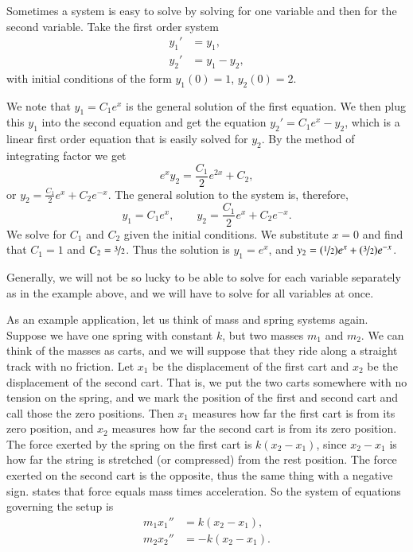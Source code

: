 \documentclass[12pt]{book}
\begin{document}
\begin{example}
Sometimes a system is easy to solve
by solving for one variable and then for the second variable.
Take 
the first order system
\begin{align*}
y_1' & = y_1 , \\
y_2' & = y_1 - y_2 ,
\end{align*}
with initial conditions
of the form $y_1(0) = 1$, $y_2(0) = 2$.

We note that $y_1 = C_1 e^x$ is the general solution of the first equation.
We then plug this $y_1$ into the second equation
and get the equation $y_2' = C_1e^x - y_2$, which is a linear first order
equation that is easily solved for $y_2$.  By the method of integrating
factor we get
\begin{equation*}
e^x y_2 = \frac{C_1}{2}e^{2x} + C_2 ,
\end{equation*}
or $y_2 = \frac{C_1}{2}e^{x} + C_2e^{-x}$.  The general solution to the system
is, therefore,
\begin{equation*}
y_1 = C_1 e^x , \qquad
y_2 = \frac{C_1}{2}e^{x} + C_2e^{-x} .
\end{equation*}
We solve for $C_1$ and $C_2$ given the initial conditions.
We substitute $x=0$ and find
that $C_1=1$ and $C_2=\nicefrac{3}{2}$.  Thus the solution is
$y_1 = e^x$, and
$y_2 = (\nicefrac{1}{2}) e^x + (\nicefrac{3}{2}) e^{-x}$.
\end{example}

Generally, we will not be so lucky to be able to solve for
each variable separately as in the 
example above, and we will have to solve for all variables at once.

\medskip

\begin{diffyfloatingfigure}{2.00in}{2.25in}
\noindent
{}
\end{diffyfloatingfigure}
As an example application, let us think of mass and spring systems again.
Suppose we have one spring with constant $k$, but two masses $m_1$
and $m_2$.  We can think of the masses as carts, and we will suppose that
they ride along a straight track with no friction.  Let $x_1$ be the displacement of the first
cart and $x_2$ be the displacement of the second cart.
That is, we put the two
carts somewhere with no tension on the spring, and we mark the position of
the first and second cart and call those the zero positions.
Then $x_1$ measures how far the first cart is from its zero position,
and $x_2$ measures how far the second cart is from its zero position.
The force exerted by the spring on the first cart is
$k(x_2-x_1)$,
since $x_2-x_1$ is how far the string is stretched (or compressed) from
the rest position.  The force exerted on the second cart is the opposite,
thus the same thing with a negative sign.
 states that
force equals mass times acceleration.  So the system of equations governing
the setup is
\begin{align*}
m_1 x_1'' & = k(x_2-x_1) , \\
m_2 x_2'' & = - k(x_2-x_1) .
\end{align*}
\end{document}
